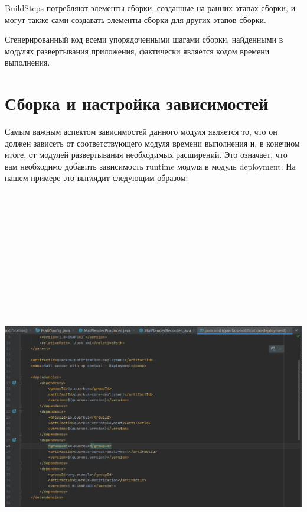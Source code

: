 \documentclass[russian,11pt]{article}
\begin{document}
	BuildSteps потребляют элементы сборки, созданные на ранних этапах сборки, и могут также сами создавать элементы сборки для других этапов сборки.

	Сгенерированный код всеми упорядоченными шагами сборки, найденными в модулях развертывания приложения, фактически является кодом времени выполнения.

\section{Сборка и настройка зависимостей}

Самым важным аспектом зависимостей данного модуля является то, что он должен зависеть от соответствующего модуля времени выполнения и, в конечном итоге, от модулей развертывания необходимых расширений. Это означает, что вам необходимо добавить зависимость runtime модуля в модуль deployment. На нашем примере это выглядит следующим образом:

~

\paragraph{\includegraphics[width=\textwidth, height=18cm]{9}}
\end{document}
